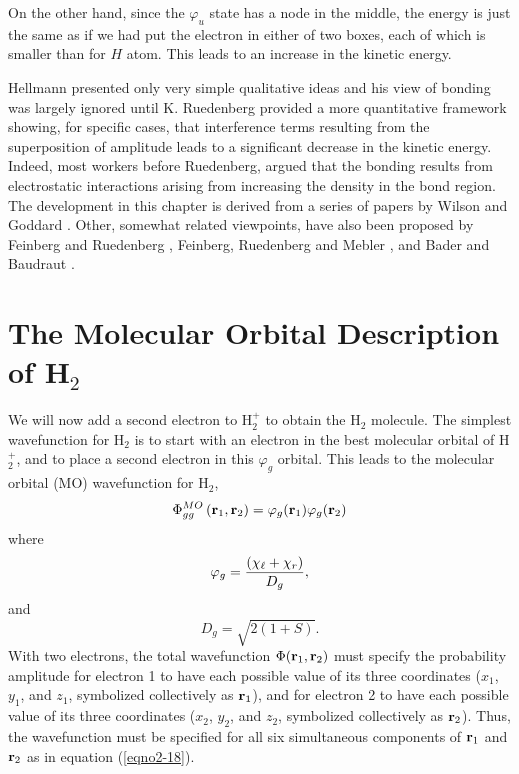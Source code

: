 On the other hand, since the $\varphi_u$ state has a node in the middle, 
the energy is just the same as if we had put the electron in either of two 
boxes, each of which is smaller than for $H$ atom. This leads to an increase 
in the kinetic energy.
    
Hellmann presented only very simple qualitative ideas and his view of
bonding was largely ignored until K. Ruedenberg \cite{rudenberg}
provided a more quantitative framework showing, for specific cases,
that interference terms resulting from the superposition of amplitude
leads to a significant decrease in the kinetic energy. Indeed, most
workers before Ruedenberg, argued that the bonding results from
electrostatic interactions arising from increasing the density in the
bond region. The development in this chapter is derived from a series
of papers by Wilson and Goddard \cite{wilson-goddard1,
wilson-goddard2}. Other, somewhat related viewpoints, have also been
proposed by Feinberg and Ruedenberg \cite{feinberg-rudenberg},
Feinberg, Ruedenberg and Mebler \cite{feinberg-rudenberg-mebler}, and
Bader and Baudraut \cite{bader-baudraut}.

\section{The Molecular Orbital Description of H$_2$}
    
We will now add a second electron to H$^+_2$ to obtain the H$_2$ molecule.
The simplest wavefunction for H$_2$ is to start with an electron in the 
best molecular orbital of H$^+_2$, and to place a second electron in 
this $\varphi_g$ orbital. This leads
to the molecular orbital (MO) wavefunction for H$_2$,
\begin{equation}
\Phi^{MO}_{gg} \left( {\bf r}_1 , {\bf r}_2 \right) = \varphi_g ( 
{\bf r}_1 ) \varphi_g ( {\bf r}_2)
\label{eqno2-18}
\end{equation}
where
\begin{equation}
\varphi_g = {\left( \chi_\ell + \chi_r \right) \over D_g},
\label{eqno2-19a}
\end{equation}
and
\begin{equation}
D_g = \sqrt{2(1+S)}.
\label{eqno2-19b}
\end{equation}
With two electrons, the total wavefunction $\Phi ( {\bf r}_1 , {\bf
r}_2)$ must specify the probability amplitude for electron 1 to have
each possible value of its three coordinates ($x_1$, $y_1$, and $z_1$,
symbolized collectively as ${\bf r}_1$), and for electron 2 to have
each possible value of its three coordinates ($x_2$, $y_2$, and $z_2$,
symbolized collectively as ${\bf r}_2$). Thus, the wavefunction must be
specified for all six simultaneous components of ${\bf r}_1$ and ${\bf
r}_2$ as in equation (\ref{eqno2-18}).
    
